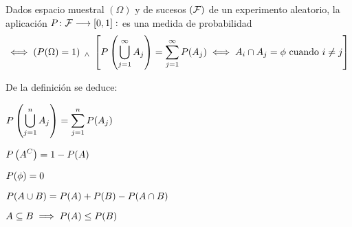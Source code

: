 \begin{defn} 
	Dados espacio muestral $(\Omega)$ y de sucesos $(\mathcal{F})$ de un experimento aleatorio, la aplicación $P \colon \mathcal{F} \longrightarrow [0, 1] : $ es una medida de probabilidad
	\[ \iff \left(P(\Omega) = 1\right) \; _{\wedge} \; \left[P\left(\bigcup_{j=1}^{\infty} A_j\right) = \sum_{j=1}^{\infty} P(A_j) \iff A_i\cap A_j = \phi \text{ cuando } i \ne j\right] \]
\end{defn}
\begin{prop}
	De la definición se deduce: \\
	\begin{enumerate*}[itemjoin=\hspace{1cm}]
		\item $\displaystyle P\left(\bigcup_{j=1}^n A_j\right) = \sum_{j=1}^{n} P(A_j)$
		\item $\displaystyle P\left(A^C\right) = 1-P(A)$
		\item $\displaystyle P(\phi) = 0$ \\
		\item $\displaystyle P(A\cup B) = P(A) + P(B) - P(A\cap B)$
		\item $\displaystyle A \subseteq B \implies P(A) \leq P(B)$
	\end{enumerate*}
\end{prop}

